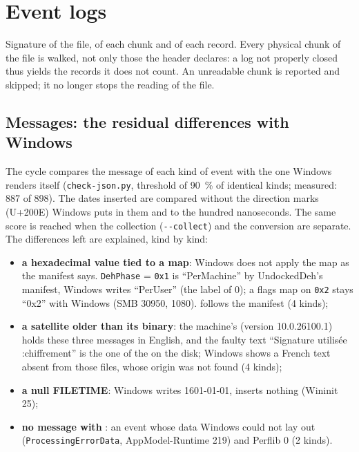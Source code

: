 \documentclass[11pt,a4paper,oneside]{report}
\begin{document}
\section{Event logs}

Signature of the file, of each chunk and of each record. Every physical chunk
of the file is walked, not only those the header declares: a log not properly
closed thus yields the records it does not count. An unreadable chunk is
reported and skipped; it no longer stops the reading of the file.

\subsection*{Messages: the residual differences with Windows}

The cycle compares the message of each kind of event with the one Windows
renders itself (\texttt{check-json.py}, threshold of 90~\% of identical kinds;
measured: 887 of 898). The dates inserted are compared without the direction
marks (U+200E) Windows puts in them and to the hundred nanoseconds. The same
score is reached when the collection (\texttt{-{}-collect}) and the conversion
are separate. The differences left are explained, kind by kind:
\begin{itemize}
  \item \textbf{a hexadecimal value tied to a map}: Windows does not apply the
        map as the manifest says. \texttt{DehPhase} = \texttt{0x1} is
        ``PerMachine'' by UndockedDeh's manifest, Windows writes ``PerUser''
        (the label of 0); a flags map on \texttt{0x2} stays ``0x2'' with
        Windows (SMB 30950, 1080). \wac{} follows the manifest (4 kinds);
  \item \textbf{a satellite older than its binary}: the machine's
         (version 10.0.26100.1)
        holds these three messages in English, and the faulty text ``Signature
        utilisée :chiffrement'' is the one of the  on
        the disk; Windows shows a French text absent from those files, whose
        origin was not found (4 kinds);
  \item \textbf{a null FILETIME}: Windows writes 1601-01-01, \wac{} inserts
        nothing (Wininit 25);
  \item \textbf{no message with \wac{}}: an event whose data Windows could not
        lay out (\texttt{ProcessingErrorData}, AppModel-Runtime 219) and
        Perflib 0 (2 kinds).
\end{itemize}
\end{document}
